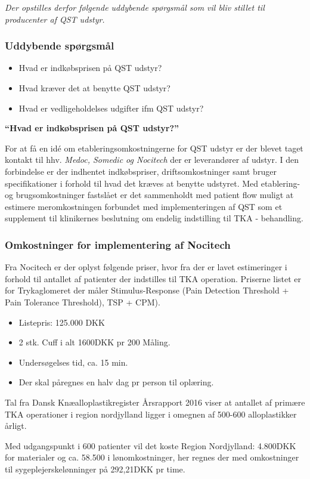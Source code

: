 \textit{Der opstilles derfor følgende uddybende spørgsmål som vil bliv stillet til producenter af QST udstyr. }

\subsubsection*{Uddybende spørgsmål}

\begin{itemize}  
\item Hvad er indkøbsprisen på QST udstyr? 
\item Hvad kræver det at benytte QST udstyr? 
\item Hvad er vedligeholdelses udgifter ifm QST udstyr?
\end{itemize}

\textbf{“Hvad er indkøbsprisen på QST udstyr?”} 

For at få en idé om etableringsomkostningerne for QST udstyr er der blevet taget kontakt til hhv. \emph{Medoc, Somedic og Nocitech} der er leverandører af udstyr. I den forbindelse er der indhentet indkøbspriser, driftsomkostninger samt bruger specifikationer i forhold til hvad det kræves at benytte udstyret. Med etablering- og brugsomkostninger fastslået er det sammenholdt med patient flow muligt at estimere meromkostningen forbundet med implementeringen af QST som et supplement til klinikernes beslutning om endelig indstilling til TKA - behandling. 

\subsubsection*{Omkostninger for implementering af Nocitech}

Fra Nocitech er der oplyst følgende priser, hvor fra der er lavet estimeringer i forhold til antallet af patienter der indstilles til TKA operation. Priserne listet er for Trykaglomeret der måler Stimulus-Response (Pain Detection Threshold + Pain Tolerance Threshold), TSP + CPM).

\begin{itemize}  
\item Listepris: 125.000 DKK
\item 2 stk. Cuff i  alt 1600DKK pr 200 Måling.
\item Undersøgelses tid, ca. 15 min.
\item Der skal påregnes en halv dag pr person til oplæring.
\end{itemize}

Tal fra Dansk Knæalloplastikregister Årsrapport 2016 viser at antallet af primære TKA operationer i region nordjylland ligger i omegnen af 500-600 alloplastikker årligt.\citep{aarsrapport2016} 

Med udgangspunkt i 600 patienter vil det koste Region Nordjylland: 4.800DKK for materialer og ca. 58.500 i lønomkostninger, her regnes der med omkostninger til sygeplejerskelønninger på 292,21DKK pr time.\citep{DST1}\citep{DST2}
